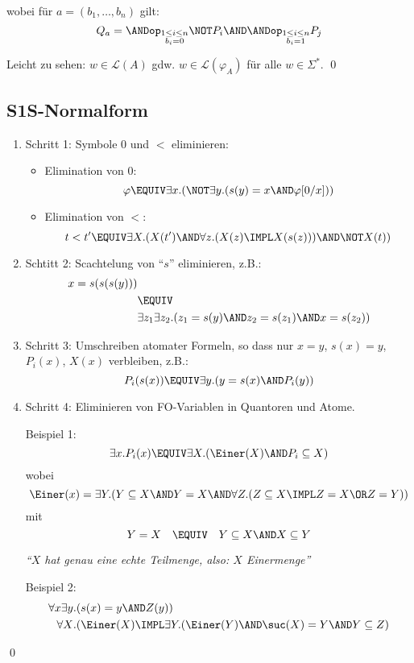 wobei für $a=(b_1,\dots,b_n)$ gilt:
\[
  Q_a = \ANDop_{\substack{1\leq i\leq n\\ b_i=0}} \NOT P_i \AND \ANDop_{\substack{1\leq i\leq n\\ b_i=1}} P_j
\]

Leicht zu sehen: $w\in\mathcal{L}(A)$ gdw. $w\in\mathcal{L}(\varphi_A)$ für alle $w\in\Sigma^*$.
\qed

\subsection{S1S-Normalform}

\begin{enumerate}
  \item Schritt 1: Symbole $0$ und $<$ eliminieren:
  \begin{itemize}
    \item Elimination von $0$:
    \[
      \varphi \EQUIV \exists x.(\NOT\exists y.(s(y)=x \AND \varphi[0/x]))
    \]
    \item Elimination von $<$:
    \[
      t<t' \EQUIV \exists X.(X(t') \AND \forall z.(X(z)\IMPL X(s(z))) \AND \NOT X(t))
    \]
  \end{itemize}
  \item Schtitt 2: Scachtelung von \enquote{$s$} eliminieren, z.B.:
  \begin{align*}
    x = s(s(s(y))) &\\
      & \EQUIV \\
      & \exists z_1\exists z_2.(z_1=s(y) \AND z_2=s(z_1) \AND x=s(z_2))
  \end{align*}
  \item Schritt 3: Umschreiben atomater Formeln, so dass nur $x=y$,
  $s(x)=y$, $P_i(x)$, $X(x)$ verbleiben, z.B.:
  \[
    P_i(s(x)) \EQUIV \exists y.(y=s(x) \AND P_i(y))
  \]
  \item Schritt 4: Eliminieren von FO-Variablen in Quantoren und Atome.
  
  Beispiel 1:
  \[
    \exists x.P_i(x) \EQUIV \exists X.(\Einer(X) \AND P_i\subseteq X)
  \]
  wobei
  \[
    \Einer(x) = \exists Y.(Y\subseteq X \AND Y=X \AND \forall Z.(Z\subseteq X \IMPL Z=X \OR Z=Y))
  \]
  mit
  \[
    Y=X \quad \EQUIV \quad Y\subseteq X \AND X\subseteq Y
  \]
  
  \strut\hfill\textit{\enquote{$X$ hat genau eine echte Teilmenge, also: $X$ Einermenge}}
  
  Beispiel 2:
  \begin{align*}
    \forall x\exists y&.(s(x)=y\AND Z(y)) \\
    \forall X&.(\Einer(X)\IMPL \exists Y.(\Einer(Y) \AND\suc(X) = Y \AND Y\subseteq Z)
  \end{align*}
\end{enumerate}
\qed

